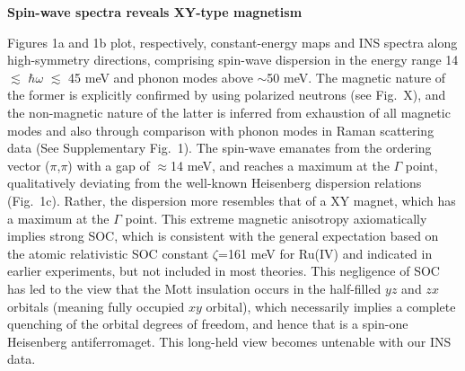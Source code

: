 \vspace{ 10 pt}
\noindent
{\bf Spin-wave spectra reveals XY-type magnetism}

\noindent
Figures 1a and 1b plot, respectively, constant-energy maps and INS spectra along high-symmetry directions, comprising spin-wave dispersion in the energy range 14 $\lesssim$ $\hbar\omega$ $\lesssim$ 45 meV and phonon modes above $\sim$50 meV. The magnetic nature of the former is explicitly confirmed by using polarized neutrons (see Fig.~X), and the non-magnetic nature of the latter is inferred from exhaustion of all magnetic modes and also through comparison with phonon modes in Raman scattering data (See Supplementary Fig.~1). The spin-wave emanates from the ordering vector ($\pi$,$\pi$) with a gap of $\approx$14 meV, and reaches a maximum at the $\Gamma$ point, qualitatively deviating from the well-known Heisenberg dispersion relations (Fig.~1c). Rather, the dispersion more resembles that of a XY magnet, which has a maximum at the $\Gamma$ point. This extreme magnetic anisotropy axiomatically implies strong SOC, which is consistent with the general expectation based on the atomic relativistic SOC constant $\zeta$=161 meV for Ru(IV) and indicated in earlier experiments\cite{Mizokawa_2001,Haverkort_2008}, but not included in most theories. This negligence of SOC has led to the view that the Mott insulation occurs in the half-filled $yz$ and $zx$ orbitals (meaning fully occupied $xy$ orbital), which necessarily implies a complete quenching of the orbital degrees of freedom, and hence that \CRO is a spin-one Heisenberg antiferromaget. This long-held view becomes untenable with our INS data.

  
  
  